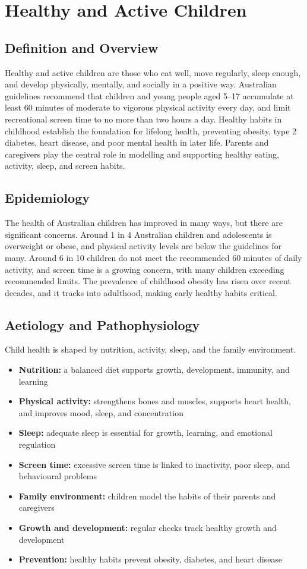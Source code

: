 \chapter{Healthy and Active Children}

\section*{Definition and Overview}
Healthy and active children are those who eat well, move regularly, sleep enough, and develop physically, mentally, and socially in a positive way. Australian guidelines recommend that children and young people aged 5--17 accumulate at least 60 minutes of moderate to vigorous physical activity every day, and limit recreational screen time to no more than two hours a day. Healthy habits in childhood establish the foundation for lifelong health, preventing obesity, type 2 diabetes, heart disease, and poor mental health in later life. Parents and caregivers play the central role in modelling and supporting healthy eating, activity, sleep, and screen habits.

\section*{Epidemiology}
The health of Australian children has improved in many ways, but there are significant concerns. Around 1 in 4 Australian children and adolescents is overweight or obese, and physical activity levels are below the guidelines for many. Around 6 in 10 children do not meet the recommended 60 minutes of daily activity, and screen time is a growing concern, with many children exceeding recommended limits. The prevalence of childhood obesity has risen over recent decades, and it tracks into adulthood, making early healthy habits critical.

\section*{Aetiology and Pathophysiology}
Child health is shaped by nutrition, activity, sleep, and the family environment.

\begin{itemize}
    \item \textbf{Nutrition:} a balanced diet supports growth, development, immunity, and learning
    \item \textbf{Physical activity:} strengthens bones and muscles, supports heart health, and improves mood, sleep, and concentration
    \item \textbf{Sleep:} adequate sleep is essential for growth, learning, and emotional regulation
    \item \textbf{Screen time:} excessive screen time is linked to inactivity, poor sleep, and behavioural problems
    \item \textbf{Family environment:} children model the habits of their parents and caregivers
    \item \textbf{Growth and development:} regular checks track healthy growth and development
    \item \textbf{Prevention:} healthy habits prevent obesity, diabetes, and heart disease
\end{itemize}

